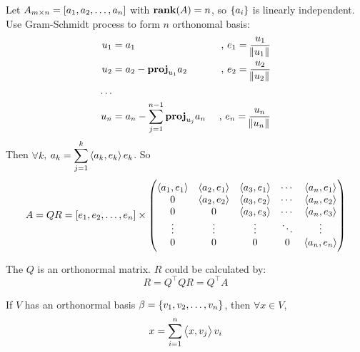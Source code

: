 \begin{theorem}
    Let $A_{m \times n} = \rowvector{a_1, a_2, \dots, a_n}$ with $\rank{A} = n$, so $\set{a_i}$ is linearly independent. Use Gram-Schmidt process to form $n$ orthonomal basis:
    \begin{equation*}
        \begin{aligned}
            u_1 &= a_1 & \text{ , } e_1 = \frac{u_1}{\norm{u_1}} \\
            u_2 &= a_2 - \projection{a_2}{u_1} & \text{ , } e_2 = \frac{u_2}{\norm{u_2}} \\
            \dots \\
            u_n &= a_n - \sum_{j=1}^{n-1} \projection{a_n}{u_j} & \text{ , } e_n = \frac{u_n}{\norm{u_n}} 
        \end{aligned}
    \end{equation*}
    Then $\forall k$, $\displaystyle a_k = \sum_{j=1}^k \innerproduct{a_k}{e_k} e_k$. So
    \begin{equation}
        A = QR = [e_1, e_2, \dots, e_n] \times \begin{pmatrix}
            \innerproduct{a_1}{e_1} & \innerproduct{a_2}{e_1} & \innerproduct{a_3}{e_1} & \cdots & \innerproduct{a_n}{e_1}\\
            0 & \innerproduct{a_2}{e_2} & \innerproduct{a_3}{e_2} & \cdots & \innerproduct{a_n}{e_2}\\
            0 & 0 & \innerproduct{a_3}{e_3} & \cdots & \innerproduct{a_n}{e_3} \\            
            \vdots & \vdots & \vdots & \ddots & \vdots \\
            0 & 0 & 0 & 0 & \innerproduct{a_n}{e_n}
        \end{pmatrix}
    \end{equation}
    
    The $Q$ is an orthonormal matrix. $R$ could be calculated by:
    \begin{equation}
        R = Q^\top Q R = Q^\top A
    \end{equation}
\end{theorem}


\begin{theorem}\label{vectorinorthonormalbasis}
	If $V$ has an orthonormal basis $\beta=\set{v_1,v_2,\dots,v_n}$, then $\forall x\in V$, 
	\begin{equation}
		x = \sum_{i=1}^n \innerproduct{x}{v_j} v_i
	\end{equation}
\end{theorem}

